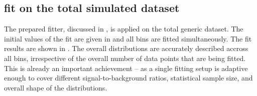 \subsection{\texorpdfstring{\Mbc}{Mbc} fit on the total simulated dataset}\label{sec:mbc_fit_full_mc}

The prepared fitter, discussed in , is applied on the total generic \MC dataset.
The initial values of the fit are given in  and all bins are fitted simultaneously.
The fit results are shown in .
The overall \Mbc distributions are accurately described accross all \EB bins, irrespective of the overall number of data points that are being fitted.
This is already an important achievement -- as a single fitting setup is adaptive enough to cover different signal-to-background ratios, statistical sample size, and overall shape of the distributions.

